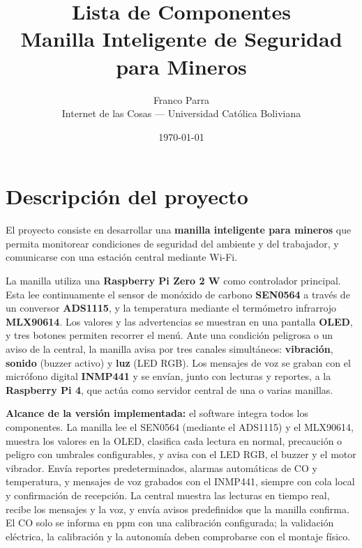 \documentclass[11pt,a4paper]{article}
\title{\vspace{-1.5cm}\textbf{Lista de Componentes}\\[0.3cm]
\large Manilla Inteligente de Seguridad para Mineros}
\author{Franco Parra \\ \small Internet de las Cosas --- Universidad Católica Boliviana}
\date{\today}
\begin{document}
\maketitle

\section{Descripción del proyecto}

El proyecto consiste en desarrollar una \textbf{manilla inteligente para mineros}
que permita monitorear condiciones de seguridad del ambiente y del trabajador, y
comunicarse con una estación central mediante Wi-Fi.

La manilla utiliza una \textbf{Raspberry Pi Zero 2 W} como controlador principal.
Esta lee continuamente el sensor de monóxido de carbono \textbf{SEN0564} a
través de un conversor \textbf{ADS1115}, y la temperatura mediante el
termómetro infrarrojo \textbf{MLX90614}. Los valores y las advertencias se muestran en una pantalla
\textbf{OLED}, y tres botones permiten recorrer el menú. Ante una condición
peligrosa o un aviso de la central, la manilla avisa por tres canales
simultáneos: \textbf{vibración}, \textbf{sonido} (buzzer activo) y
\textbf{luz} (LED RGB). Los mensajes de voz se graban con el micrófono digital
\textbf{INMP441} y se envían, junto con lecturas y reportes, a la
\textbf{Raspberry Pi 4}, que actúa como servidor central de una o varias manillas.

\textbf{Alcance de la versión implementada:} el software integra todos los
componentes. La manilla lee el SEN0564 (mediante el ADS1115) y el MLX90614, muestra
los valores en la OLED, clasifica cada lectura en normal, precaución o peligro
con umbrales configurables, y avisa con el LED RGB, el buzzer y el motor
vibrador. Envía reportes predeterminados, alarmas automáticas de CO y
temperatura, y mensajes de voz grabados con el INMP441, siempre con cola local y
confirmación de recepción. La central muestra las lecturas en tiempo real,
recibe los mensajes y la voz, y envía avisos predefinidos que la manilla
confirma. El CO solo se informa en ppm con una calibración configurada; la
validación eléctrica, la calibración y la autonomía deben comprobarse con el
montaje físico.
\end{document}
